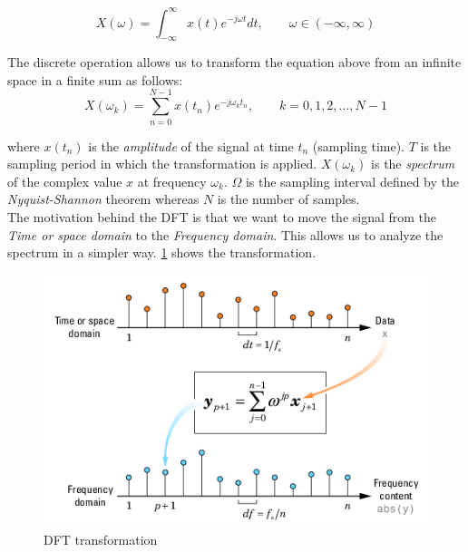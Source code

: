 \begin{equation}
X(\omega) = \int_{-\infty}^\infty x(t)e^{-j\omega t} dt, \qquad \omega\in(-\infty,\infty)
\end{equation}

\noindent The discrete operation allows us to transform the equation above from an infinite space in a finite sum as follows:
\begin{equation}
X(\omega_k ) = \sum_{n=0}^{N-1}x(t_n)e^{-j\omega_k t_n}, \qquad k=0,1,2,\ldots,N-1
\end{equation}

where $x(t_n)$ is the \textit{amplitude} of the signal at time $t_n$ (sampling time). $T$ is the sampling period in which the transformation is applied. $X(\omega_k )$ is the \textit{spectrum} of the complex value $x$ at frequency $\omega_k$. $\Omega$ is the sampling interval defined by the \textit{Nyquist-Shannon} theorem whereas $N$ is the number of samples. \\

\noindent The motivation behind the DFT is that we want to move the signal from the \textit{Time or space domain} to the \textit{Frequency domain}. This allows us to analyze the spectrum in a simpler way. \ref{fig:dft} shows the transformation.

\begin{figure}[!ht]
	\centering
	\includegraphics[scale=0.7]{Figures/dft.png}
	\caption{DFT transformation \cite{dft_matlab}}
	\label{fig:dft}
\end{figure}
